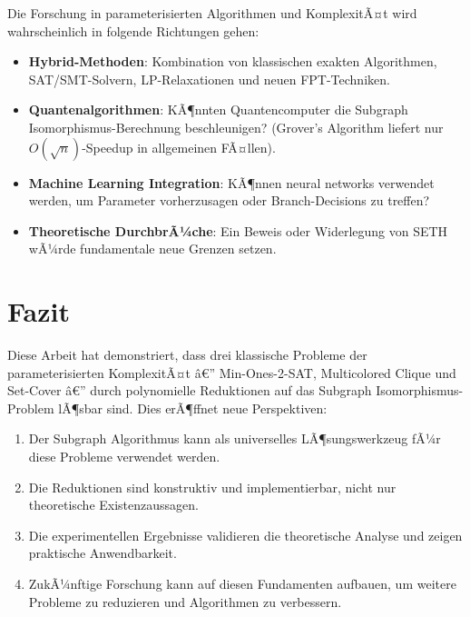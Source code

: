 ﻿\documentclass[a4paper,12pt]{article}
\theoremstyle{definition}
\begin{document}
Die Forschung in parameterisierten Algorithmen und KomplexitÃ¤t wird wahrscheinlich in folgende Richtungen gehen:

\begin{itemize}
	\item \textbf{Hybrid-Methoden}: Kombination von klassischen exakten Algorithmen, SAT/SMT-Solvern, LP-Relaxationen und neuen FPT-Techniken.
	
	\item \textbf{Quantenalgorithmen}: KÃ¶nnten Quantencomputer die Subgraph Isomorphismus-Berechnung beschleunigen? (Grover's Algorithm liefert nur $O(\sqrt{n})$-Speedup in allgemeinen FÃ¤llen).
	
	\item \textbf{Machine Learning Integration}: KÃ¶nnen neural networks verwendet werden, um Parameter vorherzusagen oder Branch-Decisions zu treffen?
	
	\item \textbf{Theoretische DurchbrÃ¼che}: Ein Beweis oder Widerlegung von SETH wÃ¼rde fundamentale neue Grenzen setzen.
\end{itemize}

\section*{Fazit}

Diese Arbeit hat demonstriert, dass drei klassische Probleme der parameterisierten KomplexitÃ¤t â€” Min-Ones-2-SAT, Multicolored Clique und Set-Cover â€” durch polynomielle Reduktionen auf das Subgraph Isomorphismus-Problem lÃ¶sbar sind. Dies erÃ¶ffnet neue Perspektiven:

\begin{enumerate}
	\item Der Subgraph Algorithmus kann als universelles LÃ¶sungswerkzeug fÃ¼r diese Probleme verwendet werden.
	
	\item Die Reduktionen sind konstruktiv und implementierbar, nicht nur theoretische Existenzaussagen.
	
	\item Die experimentellen Ergebnisse validieren die theoretische Analyse und zeigen praktische Anwendbarkeit.
	
	\item ZukÃ¼nftige Forschung kann auf diesen Fundamenten aufbauen, um weitere Probleme zu reduzieren und Algorithmen zu verbessern.
\end{enumerate}
\end{document}

